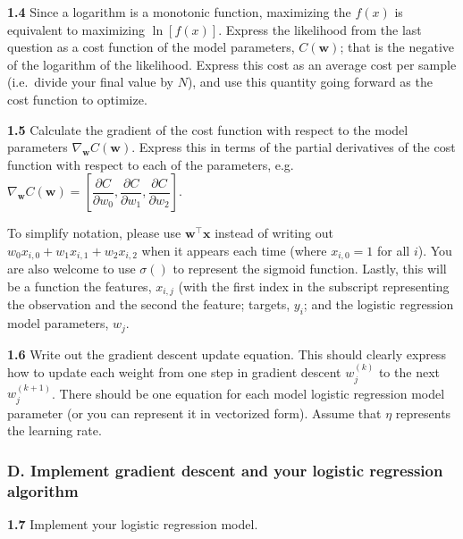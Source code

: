 \documentclass[
  letterpaper,
  DIV=11,
  numbers=noendperiod]{scrartcl}
\begin{document}
\textbf{1.4} Since a logarithm is a monotonic function, maximizing the
\(f(x)\) is equivalent to maximizing \(\ln [f(x)]\). Express the
likelihood from the last question as a cost function of the model
parameters, \(C(\mathbf{w})\); that is the negative of the logarithm of
the likelihood. Express this cost as an average cost per sample
(i.e.~divide your final value by \(N\)), and use this quantity going
forward as the cost function to optimize.

\textbf{1.5} Calculate the gradient of the cost function with respect to
the model parameters \(\nabla_{\mathbf{w}}C(\mathbf{w})\). Express this
in terms of the partial derivatives of the cost function with respect to
each of the parameters,
e.g.~\(\nabla_{\mathbf{w}}C(\mathbf{w}) = \left[\dfrac{\partial C}{\partial w_0}, \dfrac{\partial C}{\partial w_1}, \dfrac{\partial C}{\partial w_2}\right]\).

To simplify notation, please use \(\mathbf{w}^{\top}\mathbf{x}\) instead
of writing out \(w_0 x_{i,0} + w_1 x_{i,1} + w_2 x_{i,2}\) when it
appears each time (where \(x_{i,0} = 1\) for all \(i\)). You are also
welcome to use \(\sigma()\) to represent the sigmoid function. Lastly,
this will be a function the features, \(x_{i,j}\) (with the first index
in the subscript representing the observation and the second the
feature; targets, \(y_i\); and the logistic regression model parameters,
\(w_j\).

\textbf{1.6} Write out the gradient descent update equation. This should
clearly express how to update each weight from one step in gradient
descent \(w_j^{(k)}\) to the next \(w_j^{(k+1)}\). There should be one
equation for each model logistic regression model parameter (or you can
represent it in vectorized form). Assume that \(\eta\) represents the
learning rate.

\subsubsection{D. Implement gradient descent and your logistic
regression
algorithm}\label{d.-implement-gradient-descent-and-your-logistic-regression-algorithm}

\textbf{1.7} Implement your logistic regression model.
\end{document}
